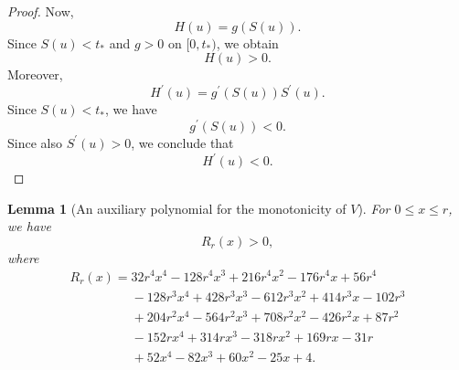 \documentclass[11pt,a4paper]{article}
\numberwithin{equation}{section}
\numberwithin{table}{section}
\theoremstyle{plain}
\newtheorem{lemma}[theorem]{Lemma}
\theoremstyle{definition}\newtheorem{definition}[theorem]{Definition}
\theoremstyle{remark}\newtheorem{remark}[theorem]{Remark}
\begin{document}
\begin{proof}
Now, 
\begin{equation*}
H(u)=g(S(u)).
\end{equation*}
Since $S(u)<t_*$ and $g>0$ on $[0,t_*)$, we obtain 
\begin{equation*}
H(u)>0.
\end{equation*}
Moreover, 
\begin{equation*}
H^{\prime}(u)=g^{\prime}(S(u))S^{\prime}(u).
\end{equation*}
Since $S(u)<t_*$, we have 
\begin{equation*}
g^{\prime}(S(u))<0.
\end{equation*}
Since also $S^{\prime}(u)>0$, we conclude that 
\begin{equation*}
H^{\prime}(u)<0.
\end{equation*}
\end{proof}

\begin{lemma}[An auxiliary polynomial for the monotonicity of $V$]\label{supp:s2lemma3}
For $0\leq x\leq r$, we have 
\begin{equation*}
R_r(x)>0,
\end{equation*}
where 
\begin{equation*}
\begin{array}{l}
R_r(x)=32r^4x^4-128r^4x^3+216r^4x^2-176r^4x+56r^4 \\ 
\phantom{R_r(x)=}{}-128r^3x^4+428r^3x^3-612r^3x^2+414r^3x-102r^3 \\ 
\phantom{R_r(x)=}{}+204r^2x^4-564r^2x^3+708r^2x^2-426r^2x+87r^2 \\ 
\phantom{R_r(x)=}{}-152rx^4+314rx^3-318rx^2+169rx-31r \\ 
\phantom{R_r(x)=}{}+52x^4-82x^3+60x^2-25x+4.%
\end{array}%
\end{equation*}
\end{lemma}
\end{document}
